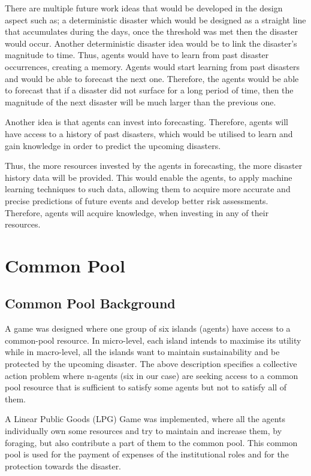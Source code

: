 There are multiple future work ideas that would be developed in the design aspect such as; a deterministic disaster which would be  designed as a straight line that accumulates during the days, once the threshold was met then the disaster would occur. Another deterministic disaster idea would be to link the disaster’s magnitude to time. Thus, agents would have to learn from past disaster occurrences, creating a memory. Agents would start learning from past disasters and would be able to forecast the next one. Therefore, the agents would be able to forecast that if a disaster did not surface for a long period of time, then the magnitude of the next disaster will be much larger than the previous one.

Another idea is that agents can invest into forecasting. Therefore, agents will have access to a history of past disasters, which would be utilised to learn and gain knowledge in order to predict the upcoming disasters.

Thus, the more resources invested by the agents in forecasting, the more disaster history data will be provided. This would enable the agents, to apply machine learning techniques to such data, allowing them to acquire more accurate and precise predictions of future events and develop better risk assessments. Therefore, agents will acquire knowledge, when investing in any of their resources.


\section{Common Pool}
\subsection{Common Pool Background}

A game was designed where one group of six islands (agents) have access to a common-pool resource. In micro-level, each island intends to maximise its utility while in macro-level, all the islands want to maintain sustainability and be protected by the upcoming disaster. The above description specifies a collective action problem where n-agents (six in our case) are seeking access to a common pool resource that is sufficient to satisfy some agents but not to satisfy all of them.

A Linear Public Goods (LPG) Game was implemented, where all the agents individually own some resources and try to maintain and increase them, by foraging, but also contribute a part of them to the common pool. This common pool is used for the payment of expenses of the institutional roles and for the protection towards the disaster.

